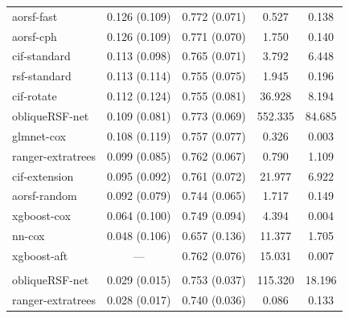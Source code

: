 \documentclass[12pt]{article}\usepackage[]{graphicx}\usepackage[]{xcolor}
\newenvironment{knitrout}{}{} %
\begin{document}
\begin{knitrout}
\begin{longtable}[t]{lcccc}
\endfoot
\bottomrule
\endlastfoot
\addlinespace[0.3em]
\multicolumn{5}{l}{\textit{\textbf{Overall}}}\\
\hline
\hspace{1em}aorsf-fast & 0.126 (0.109) & 0.772 (0.071) & 0.527 & 0.138\\
\hspace{1em}aorsf-cph & 0.126 (0.109) & 0.771 (0.070) & 1.750 & 0.140\\
\hspace{1em}cif-standard & 0.113 (0.098) & 0.765 (0.071) & 3.792 & 6.448\\
\hspace{1em}rsf-standard & 0.113 (0.114) & 0.755 (0.075) & 1.945 & 0.196\\
\hspace{1em}cif-rotate & 0.112 (0.124) & 0.755 (0.081) & 36.928 & 8.194\\
\hspace{1em}obliqueRSF-net & 0.109 (0.081) & 0.773 (0.069) & 552.335 & 84.685\\
\hspace{1em}glmnet-cox & 0.108 (0.119) & 0.757 (0.077) & 0.326 & 0.003\\
\hspace{1em}ranger-extratrees & 0.099 (0.085) & 0.762 (0.067) & 0.790 & 1.109\\
\hspace{1em}cif-extension & 0.095 (0.092) & 0.761 (0.072) & 21.977 & 6.922\\
\hspace{1em}aorsf-random & 0.092 (0.079) & 0.744 (0.065) & 1.717 & 0.149\\
\hspace{1em}xgboost-cox & 0.064 (0.100) & 0.749 (0.094) & 4.394 & 0.004\\
\hspace{1em}nn-cox & 0.048 (0.106) & 0.657 (0.136) & 11.377 & 1.705\\
\hspace{1em}xgboost-aft & --- & 0.762 (0.076) & 15.031 & 0.007\\
\addlinespace[0.3em]
\multicolumn{5}{l}{\textit{\textbf{ACTG 320; AIDS diagnosis, n = 1151, p = 12}}}\\
\hline
\hspace{1em}obliqueRSF-net & 0.029 (0.015) & 0.753 (0.037) & 115.320 & 18.196\\
\hspace{1em}ranger-extratrees & 0.028 (0.017) & 0.740 (0.036) & 0.086 & 0.133\\

\end{longtable}
\end{knitrout}
\end{document}
